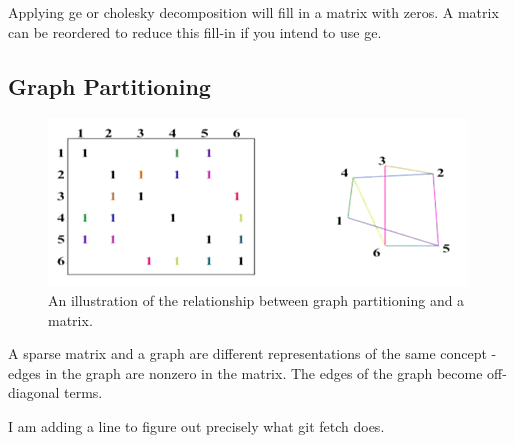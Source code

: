 \documentclass[10pt]{article}
\begin{document}
\begin{flushleft}
Applying \gls{ge} or cholesky decomposition will fill in a matrix with zeros. A matrix can be reordered to reduce this fill-in if you intend to use \gls{ge}.

\subsection{Graph Partitioning}

\begin{figure}[H]
\centering
\includegraphics[width=0.75\linewidth]{figures/graph-partitioning.pdf}
\caption{An illustration of the relationship between graph partitioning and a matrix.}
\end{figure}

A sparse matrix and a graph are different representations of the same concept - edges in the graph are nonzero in the matrix. The edges of the graph become off-diagonal terms.


I am adding a line to figure out precisely what git fetch does.
\end{flushleft}
\end{document}

